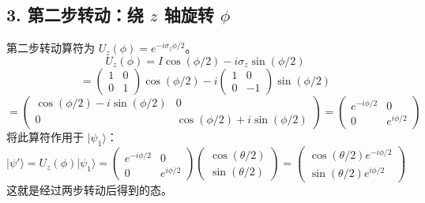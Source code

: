 \documentclass{article}
\begin{document}
\subsection*{3. 第二步转动：绕 \(z\) 轴旋转 \(\phi\)}
第二步转动算符为 \(U_z(\phi) = e^{-i\sigma_z \phi/2}\)。
\[ U_z(\phi) = I \cos(\phi/2) - i\sigma_z \sin(\phi/2) \]
\[ = \begin{pmatrix} 1 & 0 \\ 0 & 1 \end{pmatrix} \cos(\phi/2) - i \begin{pmatrix} 1 & 0 \\ 0 & -1 \end{pmatrix} \sin(\phi/2) \]
\[ = \begin{pmatrix} \cos(\phi/2) - i\sin(\phi/2) & 0 \\ 0 & \cos(\phi/2) + i\sin(\phi/2) \end{pmatrix} = \begin{pmatrix} e^{-i\phi/2} & 0 \\ 0 & e^{i\phi/2} \end{pmatrix} \]
将此算符作用于 \(|\psi_1\rangle\)：
\[ |\psi'\rangle = U_z(\phi) |\psi_1\rangle = \begin{pmatrix} e^{-i\phi/2} & 0 \\ 0 & e^{i\phi/2} \end{pmatrix} \begin{pmatrix} \cos(\theta/2) \\ \sin(\theta/2) \end{pmatrix} = \begin{pmatrix} \cos(\theta/2)e^{-i\phi/2} \\ \sin(\theta/2)e^{i\phi/2} \end{pmatrix} \]
这就是经过两步转动后得到的态。
\end{document}
